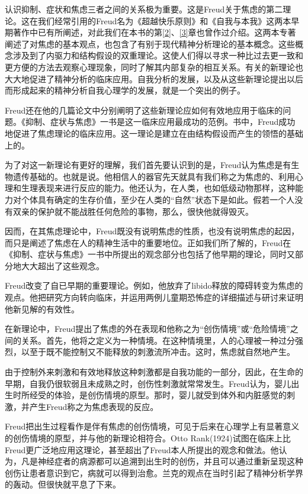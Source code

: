 \documentclass[UTF8,10pt,a4paper,openany]{book}
\begin{document}
认识抑制、症状和焦虑三者之间的关系极为重要。这是Freud关于焦虑的第二理论。这在我们经常引用的Freud名为《超越快乐原则》和《自我与本我》这两本早期著作中已有所阐述，对此我们在本书的第\ref{2}、\ref{3}章也曾作过介绍。这两本专著阐述了对焦虑的基本观点，也包含了有别于现代精神分析理论的基本概念。这些概念涉及到了内驱力和结构假设的双重理论。这使人们得以寻求一种比过去更一致和更方便的方法去观察心理现象，同时了解其内部复杂的相互关系。有关的新理论也大大地促进了精神分析的临床应用。自我分析的发展，以及从这些新理论提出以后而形成起来的精神分析自我心理学的发展，就是一个突出的例子。

Freud还在他的几篇论文中分别阐明了这些新理论应如何有效地应用于临床的问题。《抑制、症状与焦虑》一书是这一临床应用最成功的范例。书中，Freud成功地促进了焦虑理论的临床应用。这一理论是建立在由结构假设而产生的领悟的基础上的。

为了对这一新理论有更好的理解，我们首先要认识到的是，Freud认为焦虑是有生物遗传基础的。也就是说。他相信人的器官先天就具有我们称之为焦虑的、利用心理和生理表现来进行反应的能力。他还认为，在人类，也如低级动物那样，这种能力对个体具有确定的生存价值，至少在人类的“自然”状态下是如此。假若一个人没有双亲的保护就不能战胜任何危险的事物，那么，很快他就得毁灭。

因而，在其焦虑理论中，Freud既没有说明焦虑的性质，也没有说明焦虑的起因，而只是阐述了焦虑在人的精神生活中的重要地位。正如我们所了解的，Freud在《抑制、症状与焦虑》一书中所提出的观念部分也包括了他早期的理论，同时又部分地大大超出了这些观念。

Freud改变了自已早期的重要理论。例如，他放弃了libido释放的障碍转变为焦虑的观点。他把研究方向转向临床，并运用两例儿童期恐怖症的详细描述与研讨来证明他新见解的有效性。

在新理论中，Freud提出了焦虑的外在表现和他称之为“创伤情境”或“危险情境”之间的关系。首先，他将之定义为一种情境。在这种情境里，人的心理被一种过分强烈，以至于既不能控制又不能释放的刺激流所冲击。这时，焦虑就自然地产生。

由于控制外来刺激和有效地释放这种刺激都是自我功能的一部分，因此，在生命的早期，自我仍很软弱且未成熟之时，创伤性刺激就常常发生。Freud认为，婴儿出生时所经受的体验，是创伤情境的原型。那时，婴儿就受到体外和内脏感觉的刺激，并产生Freud称之为焦虑表现的反应。

Freud把出生过程看作是伴有焦虑的创伤情境，可见于后来在心理学上有显著意义的创伤情境的原型，并与他的新理论相符合。Otto Rank(1924)试图在临床上比Freud更广泛地应用这理论，甚至超出了Freud本人所提出的观念和做法。他认为，凡是神经症者的病源都可以追溯到出生时的创伤，并且可以通过重新呈现这种创伤让患者意识到它，病就可以得到治愈。兰克的观点在当时引起了精神分析学界的轰动。但很快就平息了下来。
\end{document}
